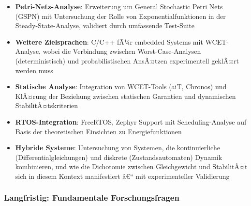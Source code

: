 ﻿\documentclass[a4paper,12pt]{scrreprt}
\theoremstyle{definition}
\begin{document}
\begin{itemize}
	\item[-] \textbf{Petri-Netz-Analyse}: Erweiterung um General Stochastic Petri Nets (GSPN) mit Untersuchung der Rolle von Exponentialfunktionen in der Steady-State-Analyse, validiert durch umfassende Test-Suite
	
	\item[-] \textbf{Weitere Zielsprachen}: C/C++ fÃ¼r embedded Systems mit WCET-Analyse, wobei die Verbindung zwischen Worst-Case-Analysen (deterministisch) und probabilistischen AnsÃ¤tzen experimentell geklÃ¤rt werden muss
	
	\item[-] \textbf{Statische Analyse}: Integration von WCET-Tools (aiT, Chronos) und KlÃ¤rung der Beziehung zwischen statischen Garantien und dynamischen StabilitÃ¤tskriterien
	
	\item[-] \textbf{RTOS-Integration}: FreeRTOS, Zephyr Support mit Scheduling-Analyse auf Basis der theoretischen Einsichten zu Energiefunktionen
	
	\item[-] \textbf{Hybride Systeme}: Untersuchung von Systemen, die kontinuierliche (Differentialgleichungen) und diskrete (Zustandsautomaten) Dynamik kombinieren, und wie die Dichotomie zwischen Gleichgewicht und StabilitÃ¤t sich in diesem Kontext manifestiert â€“ mit experimenteller Validierung
\end{itemize}

\subsubsection{Langfristig: Fundamentale Forschungsfragen}
\end{document}
